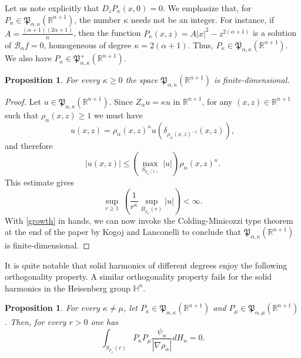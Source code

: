 \documentclass[11pt]{amsart}
\theoremstyle{plain}
\newtheorem{prop}[thrm]{Proposition}
\numberwithin{equation}{section}
\begin{document}
Let us note explicitly that $D_z P_\kappa(x,0) = 0$. We emphasize that, for $P_\kappa\in \mathfrak P_{\alpha,\kappa}({\mathbb R}^{n+1})$, the number $\kappa$ needs not be an integer. For instance, if $A = \frac{(\alpha+1)(2\alpha+1)}{n}$, then the function $P_\kappa(x,z) =  A |x|^2 - z^{2(\alpha + 1)}$ is a solution of ${\mathcal{B}_\alpha} f = 0$, homogeneous of degree $\kappa = 2(\alpha+1)$. Thus, $P_\kappa \in \mathfrak P_{\alpha,\kappa}({\mathbb R}^{n+1})$. We also have $P_\kappa \in \mathfrak P^+_{\alpha,\kappa}({\mathbb R}^{n+1})$.

\begin{prop}\label{P:cm}
For every $\kappa\ge 0$ the space $\mathfrak P_{\alpha,\kappa}({\mathbb R}^{n+1})$ is finite-dimensional.
\end{prop}

\begin{proof}
Let $u\in  \mathfrak P_{\alpha,\kappa}({\mathbb R}^{n+1})$. Since ${Z_\alpha} u = \kappa u$ in ${\mathbb R}^{n+1}$,
for any $(x,z)\in {\mathbb R}^{n+1}$ such that ${\rho_\alpha}(x,z)\ge 1$ we must have
\[
u(x,z) = {\rho_\alpha}(x,z)^\kappa u(\delta_{{\rho_\alpha}(x,z)^{-1}}(x,z)),
\]
and therefore
\[
|u(x,z)| \le \left(\underset{S_{\rho_\alpha(1)}}{\max}\ |u|\right)  {\rho_\alpha}(x,z)^\kappa.
\]
This estimate gives
\begin{equation}\label{growth}
\underset{r\ge 1}{\sup}\ \left(\frac{1}{r^\kappa} \underset{B_{\rho_\alpha}(r)}{\sup} |u|\right) <\infty.
\end{equation}
With \eqref{growth} in hands, we can now invoke the Colding-Minicozzi type theorem at the end of the paper \cite{KL} by Kogoj and Lanconelli to conclude that $\mathfrak P_{\alpha,\kappa}({\mathbb R}^{n+1})$ is finite-dimensional.

\end{proof}

It is quite notable that solid harmonics of different degrees enjoy the following orthogonality property. A similar orthogonality property fails  for the solid harmonics in the Heisenberg group ${\mathbb H^n}$.

\begin{prop}\label{P:ortho}
For every $\kappa\not= \mu$, let $P_\kappa\in \mathfrak P_{\alpha,\kappa}({\mathbb R}^{n+1})$ and $P_\mu \in \mathfrak P_{\alpha,\mu}({\mathbb R}^{n+1})$. Then, for every $r>0$ one has
\[
\int_{{S_{\rho_\alpha}(r)}} P_\kappa P_\mu \frac{\psi_\alpha}{|\nabla {\rho_\alpha}|}dH_{n} = 0.
\]
\end{prop}
\end{document}
